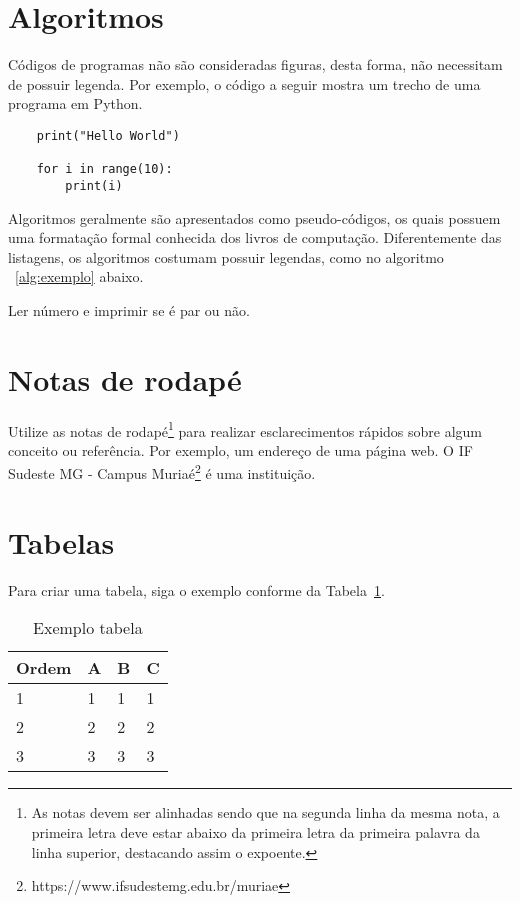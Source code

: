 \section{Algoritmos} 
Códigos de programas não são consideradas figuras, desta forma, não necessitam de possuir legenda. Por exemplo, o código a seguir mostra um trecho de uma programa em Python.
\begin{verbatim}
    print("Hello World")

    for i in range(10):
        print(i)

\end{verbatim}
Algoritmos geralmente são apresentados como pseudo-códigos, os quais possuem uma formatação formal conhecida dos livros de computação. Diferentemente das listagens, os algoritmos costumam possuir legendas, como no algoritmo ~\ref{alg:exemplo} abaixo.
\begin{algorithm*}
\label{alg:exemplo}
 \caption{Ler número e imprimir se é par ou não.}

\end{algorithm*}

\section{Notas de rodapé}

Utilize as notas de rodapé\footnote{As notas devem ser alinhadas sendo que na segunda linha da mesma nota, a primeira letra deve estar abaixo da primeira letra da primeira palavra da linha superior, destacando assim o expoente.} para realizar esclarecimentos rápidos sobre algum conceito ou referência. Por exemplo, um endereço de uma página web. O IF Sudeste MG - Campus Muriaé\footnote{https://www.ifsudestemg.edu.br/muriae} é uma instituição.

\section{Tabelas}
Para criar uma tabela, siga o exemplo conforme da Tabela~\ref{tb:exemplo_tabela}.

\begin{table}[!ht]
     \caption{Exemplo tabela}\label{tb:exemplo_tabela}
	\centering
	{\footnotesize
    \begin{tabular}{|l|l|l|l|}
    \hline
        \textbf{Ordem} & \textbf{A} & \textbf{B} & \textbf{C} \\ \hline
        1 & 1 & 1 & 1 \\ \hline
        2 & 2 & 2 & 2 \\ \hline
        3 & 3 & 3 & 3 \\ \hline
    \end{tabular}
    }
\end{table}

